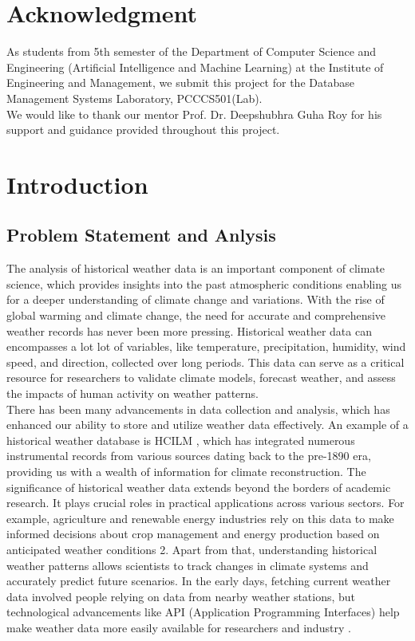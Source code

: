 \documentclass[12pt, a4paper]{article}
\begin{document}
\section*{Acknowledgment}
As students from 5th semester of the Department of Computer Science and Engineering (Artificial Intelligence and Machine Learning) at the Institute of Engineering and Management, we submit this project for the Database Management Systems Laboratory, PCCCS501(Lab). \\
We would like to thank our mentor Prof. Dr. Deepshubhra Guha Roy for his support and guidance provided throughout this project.
\newpage

\tableofcontents
\newpage
\section{Introduction}
\subsection{Problem Statement and Anlysis}
The analysis of historical weather data is an important component of climate science, which provides insights into the past atmospheric conditions enabling us for a deeper understanding of climate change and variations. With the rise of global warming and climate change, the need for accurate and comprehensive weather records has never been more pressing. Historical weather data can encompasses a lot lot of variables, like temperature, precipitation, humidity, wind speed, and direction, collected over long periods. This data can serve as a critical resource for researchers to validate climate models, forecast weather, and assess the impacts of human activity on weather patterns.\\
There has been many advancements in data collection and analysis, which has enhanced our ability to store and utilize weather data effectively. An example of a historical weather database is HCILM \cite{Lundstad2023-ky}, which has integrated numerous instrumental records from various sources dating back to the pre-1890 era, providing us with a wealth of information for climate reconstruction. 
The significance of historical weather data extends beyond the borders of academic research. It plays crucial roles in practical applications across various sectors. For example, agriculture and renewable energy industries rely on this data to make informed decisions about crop management and energy production based on anticipated weather conditions 2. Apart from that, understanding historical weather patterns allows scientists to track changes in climate systems and accurately 
predict future scenarios. In the early days, fetching current weather data involved people relying on data from nearby weather stations, but technological advancements like API (Application Programming Interfaces) help make weather data more easily available for researchers and industry \cite{weatherstackLeveragingHistorical}. 
\end{document}
